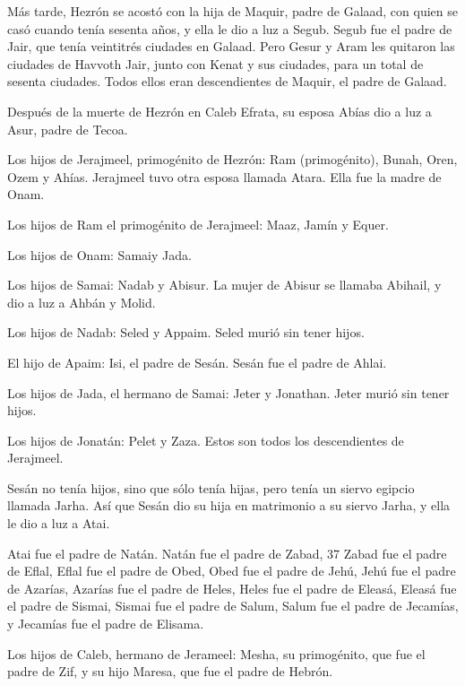  Más tarde, Hezrón se acostó con la hija de Maquir, padre
de Galaad, con quien se casó cuando tenía sesenta años, y ella le dio a
luz a Segub.  Segub fue el padre de Jair, que tenía
veintitrés ciudades en Galaad.  Pero Gesur y Aram les
quitaron las ciudades de Havvoth Jair, junto con Kenat y sus ciudades,
para un total de sesenta ciudades. Todos ellos eran descendientes de
Maquir, el padre de Galaad.

 Después de la muerte de Hezrón en Caleb Efrata, su esposa
Abías dio a luz a Asur, padre de Tecoa.

 Los hijos de Jerajmeel, primogénito de Hezrón: Ram
(primogénito), Bunah, Oren, Ozem y Ahías.  Jerajmeel tuvo
otra esposa llamada Atara. Ella fue la madre de Onam.

 Los hijos de Ram el primogénito de Jerajmeel: Maaz, Jamín
y Equer.

 Los hijos de Onam: Samaiy Jada.

Los hijos de Samai: Nadab y Abisur.  La mujer de Abisur se
llamaba Abihail, y dio a luz a Ahbán y Molid.

 Los hijos de Nadab: Seled y Appaim. Seled murió sin tener
hijos.

 El hijo de Apaim: Isi, el padre de Sesán. Sesán fue el
padre de Ahlai.

 Los hijos de Jada, el hermano de Samai: Jeter y Jonathan.
Jeter murió sin tener hijos.

 Los hijos de Jonatán: Pelet y Zaza. Estos son todos los
descendientes de Jerajmeel.

 Sesán no tenía hijos, sino que sólo tenía hijas, pero
tenía un siervo egipcio llamada Jarha.  Así que Sesán dio
su hija en matrimonio a su siervo Jarha, y ella le dio a luz a Atai.

 Atai fue el padre de Natán. Natán fue el padre de Zabad,
37 Zabad fue el padre de Eflal, Eflal fue el padre de Obed,
 Obed fue el padre de Jehú, Jehú fue el padre de Azarías,
 Azarías fue el padre de Heles, Heles fue el padre de
Eleasá,  Eleasá fue el padre de Sismai, Sismai fue el padre
de Salum,  Salum fue el padre de Jecamías, y Jecamías fue
el padre de Elisama.

 Los hijos de Caleb, hermano de Jerameel: Mesha, su
primogénito, que fue el padre de Zif, y su hijo Maresa, que fue el padre
de Hebrón.

